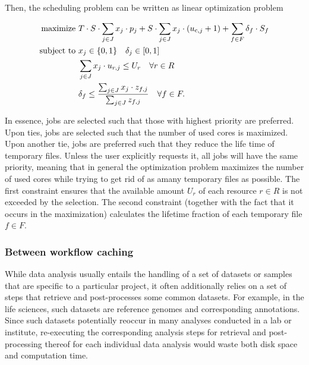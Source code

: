 \documentclass[parskip=half]{scrartcl}
\begin{document}
Then, the scheduling problem can be written as linear optimization problem 

\begin{align*}
	\text{maximize } & T \cdot S \cdot \sum_{j \in J} x_j \cdot p_j + S \cdot \sum_{j \in J} x_j \cdot (u_{\text{c},j} + 1) + \sum_{f \in F} \delta_f \cdot S_f \\ \text{subject to } & x_j \in \{0,1\} \quad \delta_j \in [0,1]\\ \quad & \sum_{j \in J} x_j \cdot u_{r,j} \leq U_r \quad \forall r \in R\\ \quad & \delta_f \leq \frac{\sum_{j \in J} x_j \cdot z_{f,j}}{\sum_{j \in J} z_{f,j}} \quad\forall f \in F.
\end{align*}

In essence, jobs are selected such that those with highest priority are preferred.
Upon ties, jobs are selected such that the number of used cores is maximized.
Upon another tie, jobs are preferred such that they reduce the life time of temporary files.
Unless the user explicitly requests it, all jobs will have the same priority, meaning that in general the optimization problem maximizes the number of used cores while trying to get rid of as amany temporary files as possible.
The first constraint ensures that the available amount $U_r$ of each resource $r \in R$ is not exceeded by the selection.
The second constraint (together with the fact that it occurs in the maximization) calculates the lifetime fraction of each temporary file $f \in F$.

\subsubsection{Between workflow caching}

While data analysis usually entails the handling of a set of datasets or samples that are specific to a particular project, it often additionally relies on a set of steps that retrieve and post-processes some common datasets.
For example, in the life sciences, such datasets are reference genomes and corresponding annotations.
Since such datasets potentially reoccur in many analyses conducted in a lab or institute, re-executing the corresponding analysis steps for retrieval and post-processing thereof for each individual data analysis would waste both disk space and computation time.
\end{document}

